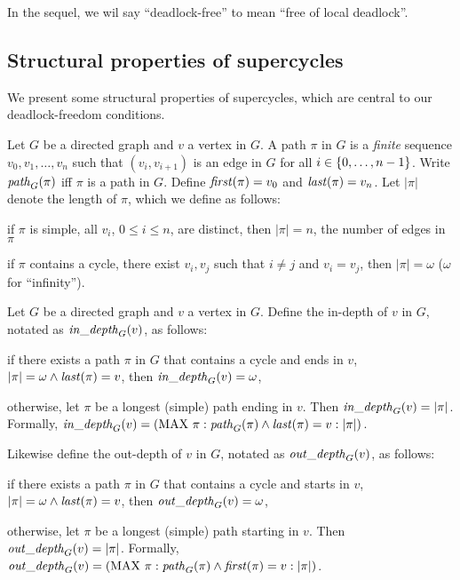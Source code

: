 In the sequel, we wil say ``deadlock-free'' to mean ``free of local deadlock''.



\subsection{Structural properties of supercycles}

We present some structural properties of supercycles, which
are central to our deadlock-freedom conditions.


 \label{def:path}
Let $G$ be a directed graph and $v$ a vertex in $G$. A path $\pi$ in $G$ is a \emph{finite} sequence
$v_0, v_1, \ldots,v_n$ such that $(v_i, v_{i+1})$ is an edge in $G$ for all $i \in \{ 0,\ldots,n-1 \}$.
Write $\mathit{path}_{G}(\pi)$ iff $\pi$ is a path in $G$.
Define $\mathit{first}(\pi) = v_0$ and $\mathit{last}(\pi) = v_n$. 
%
Let $|\pi|$ denote the length of $\pi$, which we define as follows:
\be
\item if $\pi$ is simple, \ie all $v_i$, $0 \le i \le n$, are distinct, then $|\pi| = n$, \ie the
number of edges in $\pi$
\item if $\pi$ contains a cycle, \ie there exist $v_i, v_j$ such that $i \ne j$ and $v_i = v_j$, then
$|\pi| = \omega$ ($\omega$ for ``infinity'').
\ee

\ed

 \label{def:depth} 
Let $G$ be a directed graph and $v$ a vertex in $G$. Define the in-depth of $v$ in $G$, notated as
$\mathit{in\_depth}_{G}({v})$, as follows:
\be
\item if there exists a path $\pi$ in $G$ that contains a cycle and ends in $v$, \ie $|\pi| = \omega
  \land \mathit{last}(\pi) = v$, then $\mathit{in\_depth}_{G}({v}) = \omega$,

\item otherwise, let $\pi$ be a longest (simple) path ending in $v$. Then $\mathit{in\_depth}_{G}({v}) = |\pi|$.
\ee
Formally, $\mathit{in\_depth}_{G}({v}) = (\mathrm{MAX}\ \pi : \mathit{path}_{G}(\pi) \land \mathit{last}(\pi) = v : |\pi|)$.

Likewise define the out-depth of $v$ in $G$, notated as
$\mathit{out\_depth}_{G}({v})$, as follows:
\be
\item if there exists a path $\pi$ in $G$ that contains a cycle and starts in $v$, \ie $|\pi| = \omega
  \land \mathit{last}(\pi) = v$, then $\mathit{out\_depth}_{G}({v}) = \omega$,

\item otherwise, let $\pi$ be a longest (simple) path starting in $v$. Then $\mathit{out\_depth}_{G}({v}) = |\pi|$.
\ee
Formally, $\mathit{out\_depth}_{G}({v}) = (\mathrm{MAX}\ \pi : \mathit{path}_{G}(\pi) \land \mathit{first}(\pi) = v : |\pi|)$.
\ed

